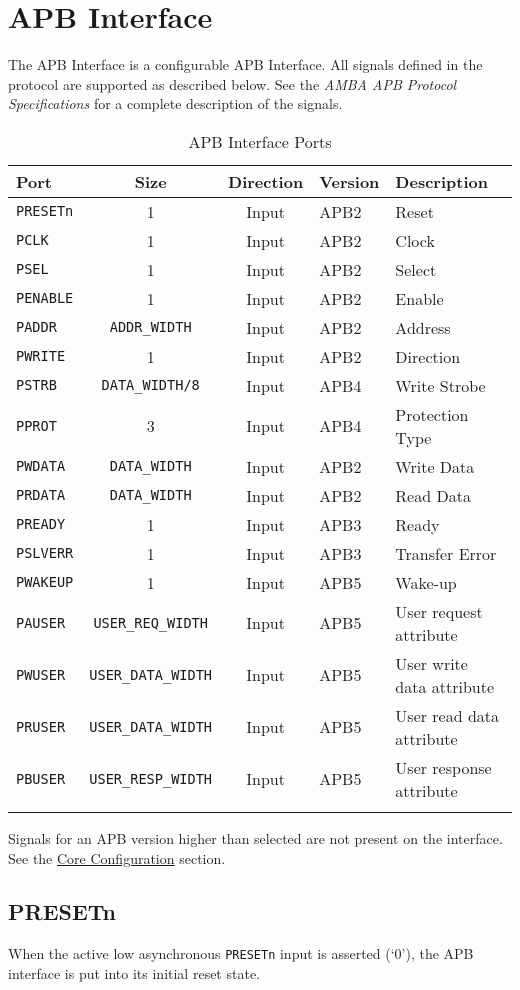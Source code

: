 \section{APB Interface}\label{apb-interface}

The APB Interface is a configurable APB Interface. All signals
defined in the protocol are supported as described below. See the
\emph{AMBA APB Protocol Specifications} for a complete description
of the signals.

\begin{longtable}[]{@{}lccll@{}}
\toprule
\textbf{Port} & \textbf{Size} & \textbf{Direction} & \textbf{Version} & \textbf{Description}\tabularnewline
\midrule
\endhead
\texttt{PRESETn} & 1 & Input & APB2 & Reset\tabularnewline
\texttt{PCLK} & 1 & Input & APB2 & Clock\tabularnewline
\texttt{PSEL} & 1 & Input & APB2 & Select\tabularnewline
\texttt{PENABLE} & 1 & Input & APB2 & Enable\tabularnewline
\texttt{PADDR} & \texttt{ADDR\_WIDTH} & Input & APB2 & Address\tabularnewline
\texttt{PWRITE} & 1 & Input & APB2 & Direction\tabularnewline
\texttt{PSTRB} & \texttt{DATA\_WIDTH/8} & Input & APB4 & Write Strobe\tabularnewline
\texttt{PPROT} & 3 & Input & APB4 & Protection Type\tabularnewline
\texttt{PWDATA} & \texttt{DATA\_WIDTH} & Input & APB2 & Write Data\tabularnewline
\texttt{PRDATA} & \texttt{DATA\_WIDTH} & Input & APB2 & Read Data\tabularnewline
\texttt{PREADY} & 1 & Input & APB3 & Ready\tabularnewline
\texttt{PSLVERR} & 1 & Input & APB3 & Transfer Error\tabularnewline
\texttt{PWAKEUP} & 1 & Input & APB5 & Wake-up\tabularnewline
\texttt{PAUSER} & \texttt{USER\_REQ\_WIDTH} & Input & APB5 & User request attribute\tabularnewline
\texttt{PWUSER} & \texttt{USER\_DATA\_WIDTH} & Input & APB5 & User write data attribute\tabularnewline
\texttt{PRUSER} & \texttt{USER\_DATA\_WIDTH} & Input & APB5 & User read data attribute\tabularnewline
\texttt{PBUSER} & \texttt{USER\_RESP\_WIDTH} & Input & APB5 & User response attribute\tabularnewline
\bottomrule
\caption{APB Interface Ports}
\end{longtable}

Signals for an APB version higher than selected are not present on the interface. See the \hyperref[core-configuration]{Core Configuration} section.


\subsection{PRESETn}\label{presetn}

When the active low asynchronous \texttt{PRESETn} input is asserted (`0'), the
APB interface is put into its initial reset state. 

